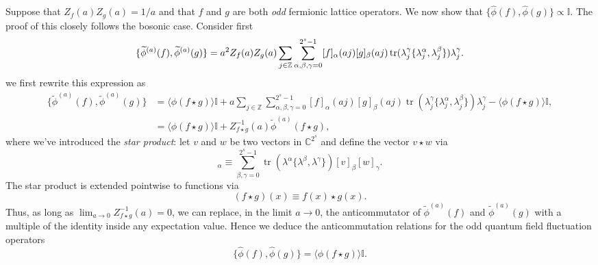 \documentclass[prl,twocolumn,lengthcheck,superscriptaddress]{revtex4-1}
\newcommand{\tr}{\operatorname{tr}}
\theoremstyle{definition}
\theoremstyle{remark}
\begin{document}
Suppose that $Z_f(a)Z_g(a) = 1/a$ and that $f$ and $g$ are both \emph{odd} fermionic lattice operators. We now show that $\{\widehat{\phi}(f), \widehat{\phi}(g)\} \propto \mathbb{I}$. The proof of this closely follows the bosonic case.  Consider first
\begin{equation}
			\{\widetilde{\phi}^{(a)}(f), \widetilde{\phi}^{(a)}(g)\} = a^2Z_f(a)Z_g(a)\sum_{j\in\mathbb{Z}} \sum_{\alpha,\beta,\gamma=0}^{2^s-1} [f]_\alpha(aj)[g]_\beta(aj) \tr(\lambda^{\gamma}_j\{\lambda_j^\alpha, \lambda_j^\beta\})  \lambda^\gamma_j. \\
\end{equation} 
we first rewrite this expression as 
\begin{equation}
	\begin{split}
		\{\widetilde{\phi}^{(a)}(f), \widetilde{\phi}^{(a)}(g)\} &= \langle\phi(f\star g)\rangle\mathbb{I} + a\sum_{j\in\mathbb{Z}} \sum_{\alpha,\beta,\gamma=0}^{2^s-1} [f]_\alpha(aj)[g]_\beta(aj) \tr(\lambda^{\gamma}_j\{\lambda_j^\alpha, \lambda_j^\beta\})  \lambda^\gamma_j - \langle \phi(f\star g)\rangle\mathbb{I}, \\
		&= \langle\phi(f\star g)\rangle\mathbb{I} + Z^{-1}_{f\star g}(a)\widetilde{\phi}^{(a)}(f\star g),
	\end{split}
\end{equation}
where we've introduced the \emph{star product}: let $v$ and $w$ be two vectors in $\mathbb{C}^{2^s}$ and define the vector $v\star w$ via
\begin{equation}
	[v\star w]_\alpha \equiv \sum_{\beta,\gamma = 0}^{2^s-1}\tr(\lambda^{\alpha}\{\lambda^\beta, \lambda^\gamma\})[v]_\beta[w]_\gamma.
\end{equation}
The star product is extended pointwise to functions via
\begin{equation}
	(f\star g)(x) \equiv f(x)\star g(x).
\end{equation}
Thus, as long as $\lim_{a\rightarrow 0} Z^{-1}_{f\star g}(a) = 0$, we can replace, in the limit $a\rightarrow 0$, the anticommutator of $\widetilde{\phi}^{(a)}(f)$ and $\widetilde{\phi}^{(a)}(g)$ with a multiple of the identity inside any expectation value. Hence we deduce the anticommutation relations for the odd quantum field fluctuation  operators
\begin{equation}
	\{\widehat{\phi}(f), \widehat{\phi}(g)\} = \langle\phi(f\star g)\rangle\mathbb{I}.
\end{equation}
\end{document}
